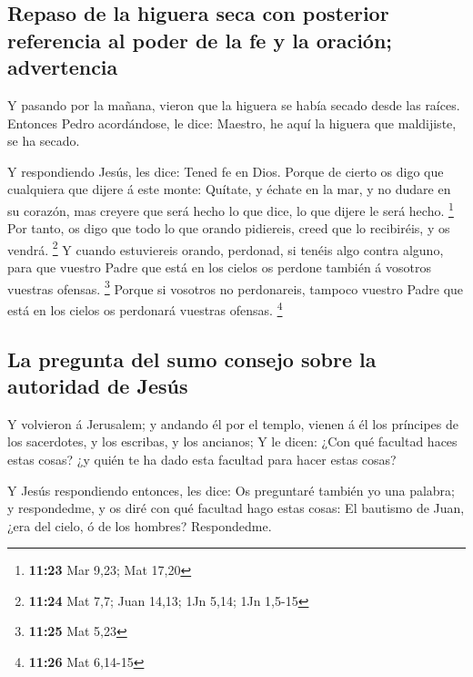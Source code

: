 \hypertarget{repaso-de-la-higuera-seca-con-posterior-referencia-al-poder-de-la-fe-y-la-oraciuxf3n-advertencia}{%
\subsection{Repaso de la higuera seca con posterior referencia al poder
de la fe y la oración;
advertencia}\label{repaso-de-la-higuera-seca-con-posterior-referencia-al-poder-de-la-fe-y-la-oraciuxf3n-advertencia}}

 Y pasando por la mañana, vieron que la higuera se había
secado desde las raíces.  Entonces Pedro acordándose, le
dice: Maestro, he aquí la higuera que maldijiste, se ha secado.

 Y respondiendo Jesús, les dice: Tened fe en Dios.
 Porque de cierto os digo que cualquiera que dijere á este
monte: Quítate, y échate en la mar, y no dudare en su corazón, mas
creyere que será hecho lo que dice, lo que dijere le será hecho.
\footnote{\textbf{11:23} Mar 9,23; Mat 17,20}  Por tanto,
os digo que todo lo que orando pidiereis, creed que lo recibiréis, y os
vendrá. \footnote{\textbf{11:24} Mat 7,7; Juan 14,13; 1Jn 5,14; 1Jn
  1,5-15}  Y cuando estuviereis orando, perdonad, si tenéis
algo contra alguno, para que vuestro Padre que está en los cielos os
perdone también á vosotros vuestras ofensas. \footnote{\textbf{11:25}
  Mat 5,23}  Porque si vosotros no perdonareis, tampoco
vuestro Padre que está en los cielos os perdonará vuestras ofensas.
\footnote{\textbf{11:26} Mat 6,14-15}

\hypertarget{la-pregunta-del-sumo-consejo-sobre-la-autoridad-de-jesuxfas}{%
\subsection{La pregunta del sumo consejo sobre la autoridad de
Jesús}\label{la-pregunta-del-sumo-consejo-sobre-la-autoridad-de-jesuxfas}}

 Y volvieron á Jerusalem; y andando él por el templo,
vienen á él los príncipes de los sacerdotes, y los escribas, y los
ancianos;  Y le dicen: ¿Con qué facultad haces estas cosas?
¿y quién te ha dado esta facultad para hacer estas cosas?

 Y Jesús respondiendo entonces, les dice: Os preguntaré
también yo una palabra; y respondedme, y os diré con qué facultad hago
estas cosas:  El bautismo de Juan, ¿era del cielo, ó de los
hombres? Respondedme.

